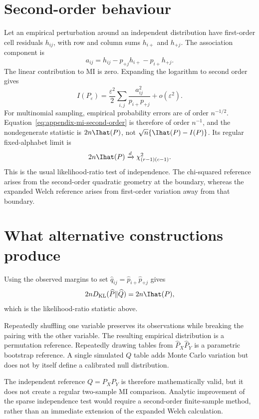 \section{Second-order behaviour}

Let an empirical perturbation around an independent distribution have
first-order cell residuals $h_{ij}$, with row and column sums $h_{i+}$ and
$h_{+j}$. The association component is
\begin{equation}
  a_{ij}=h_{ij}-p_{+j}h_{i+}-p_{i+}h_{+j}.
\end{equation}
The linear contribution to MI is zero. Expanding the logarithm to second
order gives
\begin{equation}
  I(P_\varepsilon)
  =\frac{\varepsilon^2}{2}
  \sum_{i,j}\frac{a_{ij}^2}{p_{i+}p_{+j}}
  +o(\varepsilon^2).
  \label{eq:appendix-mi-second-order}
\end{equation}
For multinomial sampling, empirical probability errors are of order
$n^{-1/2}$. Equation~\eqref{eq:appendix-mi-second-order} is therefore of
order $n^{-1}$, and the nondegenerate statistic is $2n\Ihat(P)$, not
$\sqrt n\{\Ihat(P)-I(P)\}$. Its regular fixed-alphabet limit is
\begin{equation}
  2n\Ihat(P)
  \xrightarrow{d}
  \chi^2_{(r-1)(c-1)}.
\end{equation}
This is the usual likelihood-ratio test of independence. The chi-squared
reference arises from the second-order quadratic geometry at the boundary,
whereas the expanded Welch reference arises from first-order variation away
from that boundary.

\section{What alternative constructions produce}

Using the observed margins to set
$\widehat q_{ij}=\widehat p_{i+}\widehat p_{+j}$ gives
\begin{equation}
  2nD_{\mathrm{KL}}(\widehat P\Vert\widehat Q)
  =2n\Ihat(P),
\end{equation}
which is the likelihood-ratio statistic above.

Repeatedly shuffling one variable preserves its observations while breaking
the pairing with the other variable. The resulting empirical distribution is
a permutation reference. Repeatedly drawing tables from
$\widehat P_X\widehat P_Y$ is a parametric bootstrap reference. A single
simulated $Q$ table adds Monte Carlo variation but does not by itself define
a calibrated null distribution.

The independent reference $Q=P_XP_Y$ is therefore mathematically valid, but
it does not create a regular two-sample MI comparison. Analytic improvement of
the sparse independence test would require a second-order finite-sample
method, rather than an immediate extension of the expanded Welch calculation.
